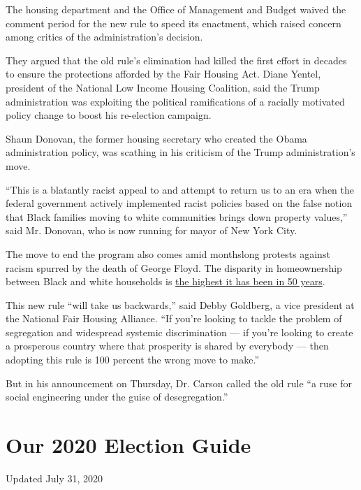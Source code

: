 The housing department and the Office of Management and Budget waived
the comment period for the new rule to speed its enactment, which raised
concern among critics of the administration's decision.

They argued that the old rule's elimination had killed the first effort
in decades to ensure the protections afforded by the Fair Housing Act.
Diane Yentel, president of the National Low Income Housing Coalition,
said the Trump administration was exploiting the political ramifications
of a racially motivated policy change to boost his re-election campaign.

Shaun Donovan, the former housing secretary who created the Obama
administration policy, was scathing in his criticism of the Trump
administration's move.

``This is a blatantly racist appeal to and attempt to return us to an
era when the federal government actively implemented racist policies
based on the false notion that Black families moving to white
communities brings down property values,'' said Mr. Donovan, who is now
running for mayor of New York City.

The move to end the program also comes amid monthslong protests against
racism spurred by the death of George Floyd. The disparity in
homeownership between Black and white households is
\href{https://www.urban.org/research/publication/explaining-black-white-homeownership-gap-closer-look-disparities-across-local-markets/view/full_report}{the
highest it has been in 50 years}.

This new rule ``will take us backwards,'' said Debby Goldberg, a vice
president at the National Fair Housing Alliance. ``If you're looking to
tackle the problem of segregation and widespread systemic discrimination
--- if you're looking to create a prosperous country where that
prosperity is shared by everybody --- then adopting this rule is 100
percent the wrong move to make.''

But in his announcement on Thursday, Dr. Carson called the old rule ``a
ruse for social engineering under the guise of desegregation.''

\hypertarget{our-2020-election-guide}{%
\section{Our 2020 Election Guide}\label{our-2020-election-guide}}

Updated July 31, 2020

